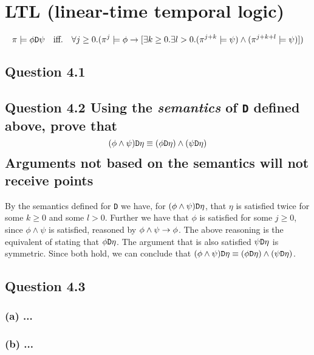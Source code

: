 \section{LTL (linear-time temporal logic)}

\[
	\pi \models \phi \text{\tt D} \psi
	\quad \text{iff.} \quad
	\forall j \geq 0.(\pi^j \models \phi \to
	[\exists k \geq 0.\exists l > 0.(\pi^{j+k} \models \psi)
	\land (\pi^{j+k+l} \models \psi)])
\]

\subsection*{Question 4.1}
\subsection*{Question 4.2 \mdseries Using the {\it semantics} of {\tt D}
defined above, prove that \[(\phi \land \psi)\text{\tt D}\eta \equiv
(\phi\text{\tt D}\eta) \land (\psi\text{\tt D}\eta)\]
Arguments not based on the semantics will not receive points}

By the semantics defined for {\tt D} we have, for $(\phi \land \psi)
\text{\tt D} \eta$, that $\eta$ is satisfied twice for some $k \geq 0$ and
some $l > 0$. Further we have that $\phi$ is satisfied for some $j \geq 0$,
since $\phi \land \psi$ is satisfied, reasoned by $\phi \land \psi \to \phi$.
The above reasoning is the equivalent of stating that $\phi \text{\tt D}
\eta$. The argument that is also satisfied $\psi \text{\tt D} \eta$ is
symmetric. Since both hold, we can conclude that $(\phi \land \psi)
\text{\tt D}\eta \equiv (\phi\text{\tt D}\eta) \land (\psi\text{\tt D}\eta)$.

\subsection*{Question 4.3}
\subsubsection*{(a) \mdseries ...}
\subsubsection*{(b) \mdseries ...}
